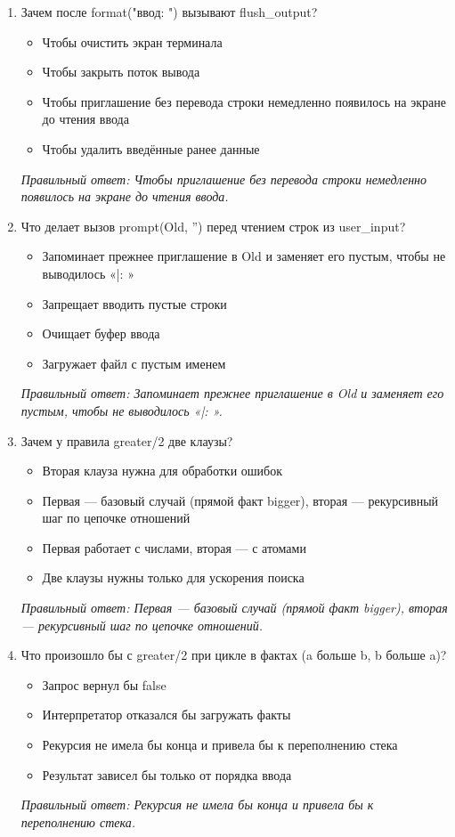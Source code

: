 \begin{enumerate}[label=\textbf{\arabic*.}, leftmargin=0pt, itemsep=1.2em]
\item Зачем после format("ввод: ") вызывают flush\_output?
\begin{itemize}[label=$\square$, leftmargin=1.5cm, itemsep=0.2em, topsep=0.3em]
\item Чтобы очистить экран терминала
\item Чтобы закрыть поток вывода
\item Чтобы приглашение без перевода строки немедленно появилось на экране до чтения ввода
\item Чтобы удалить введённые ранее данные
\end{itemize}
{\small\textit{Правильный ответ: Чтобы приглашение без перевода строки немедленно появилось на экране до чтения ввода.}}

\item Что делает вызов prompt(Old, '') перед чтением строк из user\_input?
\begin{itemize}[label=$\square$, leftmargin=1.5cm, itemsep=0.2em, topsep=0.3em]
\item Запоминает прежнее приглашение в Old и заменяет его пустым, чтобы не выводилось «|: »
\item Запрещает вводить пустые строки
\item Очищает буфер ввода
\item Загружает файл с пустым именем
\end{itemize}
{\small\textit{Правильный ответ: Запоминает прежнее приглашение в Old и заменяет его пустым, чтобы не выводилось «|: ».}}

\item Зачем у правила greater/2 две клаузы?
\begin{itemize}[label=$\square$, leftmargin=1.5cm, itemsep=0.2em, topsep=0.3em]
\item Вторая клауза нужна для обработки ошибок
\item Первая — базовый случай (прямой факт bigger), вторая — рекурсивный шаг по цепочке отношений
\item Первая работает с числами, вторая — с атомами
\item Две клаузы нужны только для ускорения поиска
\end{itemize}
{\small\textit{Правильный ответ: Первая — базовый случай (прямой факт bigger), вторая — рекурсивный шаг по цепочке отношений.}}

\item Что произошло бы с greater/2 при цикле в фактах (a больше b, b больше a)?
\begin{itemize}[label=$\square$, leftmargin=1.5cm, itemsep=0.2em, topsep=0.3em]
\item Запрос вернул бы false
\item Интерпретатор отказался бы загружать факты
\item Рекурсия не имела бы конца и привела бы к переполнению стека
\item Результат зависел бы только от порядка ввода
\end{itemize}
{\small\textit{Правильный ответ: Рекурсия не имела бы конца и привела бы к переполнению стека.}}


\end{enumerate}
